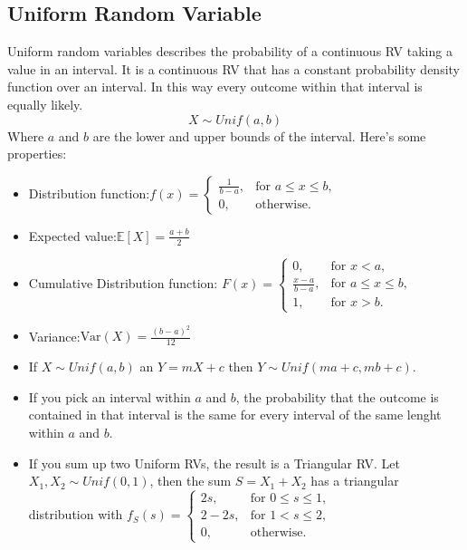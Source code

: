 \documentclass[a4paper]{article}
\begin{document}
\subsection{Uniform Random Variable}
Uniform random variables describes the probability of a continuous RV taking a value in an interval. It is a continuous RV that has a constant probability density function over an interval. In this way every outcome within that interval is equally likely.
$$X \sim Unif(a, b)$$
Where \(a\) and \(b\) are the lower and upper bounds of the interval. Here's some properties:

\begin{itemize}
    \item Distribution function:$ f(x) =  \begin{cases}  \frac{1}{b - a}, & \text{for } a \leq x \leq b, \\ 0, & \text{otherwise}. \end{cases}$
    \item Expected value:$\mathbb{E}[X] = \frac{a + b}{2}$
    \item Cumulative Distribution function: $ F(x) = \begin{cases}  0, & \text{for } x < a, \\ \frac{x - a}{b - a}, & \text{for } a \leq x \leq b, \\ 1, & \text{for } x > b. \end{cases}$
    \item Variance:$\text{Var}(X) = \frac{(b - a)^2}{12}$
    \item If $X \sim Unif(a, b)$ an $Y = mX + c$ then $Y \sim Unif(ma + c, mb + c)$.
    \item If you pick an interval within $a$ and $b$, the probability that the outcome is contained in that interval is the same for every interval of the same lenght within $a$ and $b$.
    \item If you sum up two Uniform RVs, the result is a Triangular RV.
    \subitem Let $X_1, X_2 \sim Unif(0, 1)$, then the sum $S = X_1 + X_2$ has a triangular distribution with $f_S(s) = \begin{cases} 2s, & \text{for } 0 \leq s \leq 1, \\ 2 - 2s, & \text{for } 1 < s \leq 2, \\ 0, & \text{otherwise}. \end{cases}$


\end{itemize}
\end{document}
